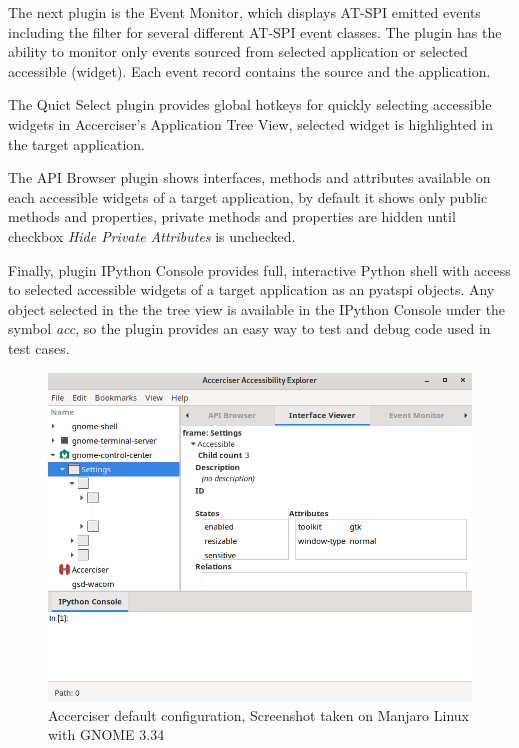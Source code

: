 The next plugin is the Event Monitor, which displays AT-SPI emitted events including the filter for several different AT-SPI event classes. The plugin has the ability to monitor only events sourced from selected application or selected accessible (widget). Each event record contains the source and the application.

The Quict Select plugin provides global hotkeys for quickly selecting accessible widgets in Accerciser's Application Tree View, selected widget is highlighted in the target application.

The API Browser plugin shows interfaces, methods and attributes available on each accessible widgets of a target application, by default it shows only public methods and properties, private methods and properties are hidden until checkbox \textit{Hide Private Attributes} is unchecked.
 
Finally, plugin IPython Console provides full, interactive Python shell with access to selected accessible widgets of a target application as an pyatspi objects. Any object selected in the the tree view is available in the IPython Console under the symbol \textit{acc}, so the plugin provides an easy way to test and debug code used in test cases.    

\begin{figure}[hbt]
	\centering
	\includegraphics[width=1\textwidth]{obrazky-figures/accerciser.png}
	\caption{Accerciser default configuration, Screenshot taken on Manjaro Linux with GNOME 3.34}
	\label{Accerciser}
\end{figure}


